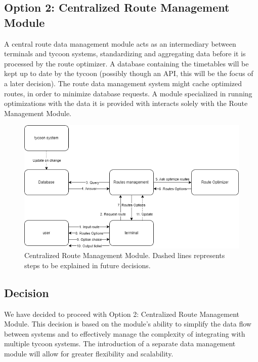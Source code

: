 \subsection*{Option 2: Centralized Route Management Module}
A central route data management module acts as an intermediary between terminals and tycoon systems, standardizing and aggregating data before it is processed by the route optimizer. A database containing the timetables will be kept up to date by the tycoon (possibly though an API, this will be the focus of a later decision). The route data management system might cache optimized routes, in order to minimize database requests. A module specialized in running optimizations with the data it is provided with interacts solely with the Route Management Module.
\begin{figure}[ht]
    \centering
    \includegraphics[width=\textwidth]{drawings/decision3_drawings/centralized.png}
    \caption{Centralized Route Management Module. Dashed lines represents steps to be explained in future decisions.}
    \label{fig:centralized-data-interface}
\end{figure}
  
\subsection*{Decision}
We have decided to proceed with Option 2: Centralized Route Management Module. This decision is based on the module's ability to simplify the data flow between systems and to effectively manage the complexity of integrating with multiple tycoon systems. The introduction of a separate data management module will allow for greater flexibility and scalability.

